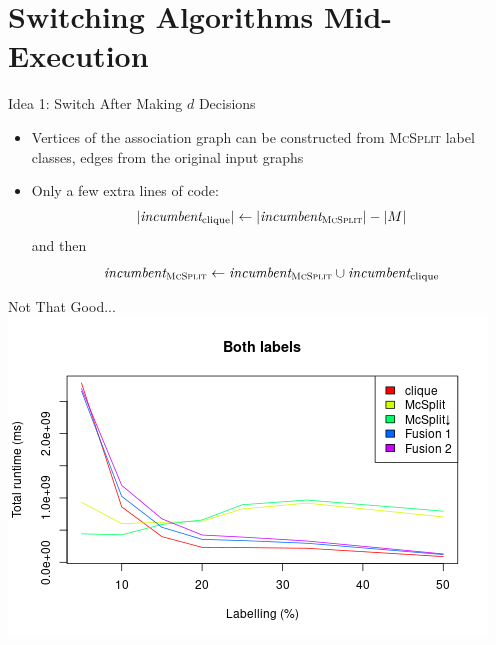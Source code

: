 \documentclass{beamer}
\begin{document}
\section{Switching Algorithms Mid-Execution}

\begin{frame}{Idea 1: Switch After Making $d$ Decisions}
  \pause
  \begin{itemize}
  \item Vertices of the association graph can be constructed from \textsc{McSplit}
    label classes, edges from the original input graphs
  \item Only a few extra lines of code:
    \[ |\textit{incumbent}_{\text{clique}}| \gets
      |\textit{incumbent}_{\text{\textsc{McSplit}}}| - |M| \]
    and then
    \[ \textit{incumbent}_{\textsc{McSplit}} \gets
      \textit{incumbent}_{\textsc{McSplit}} \cup
      \textit{incumbent}_{\text{clique}} \]
  \end{itemize}
\end{frame}

\begin{frame}{Not That Good...}
  \centering
  \includegraphics[scale=0.5]{../dissertation/images/fusion_linechart.png}
\end{frame}
\end{document}
